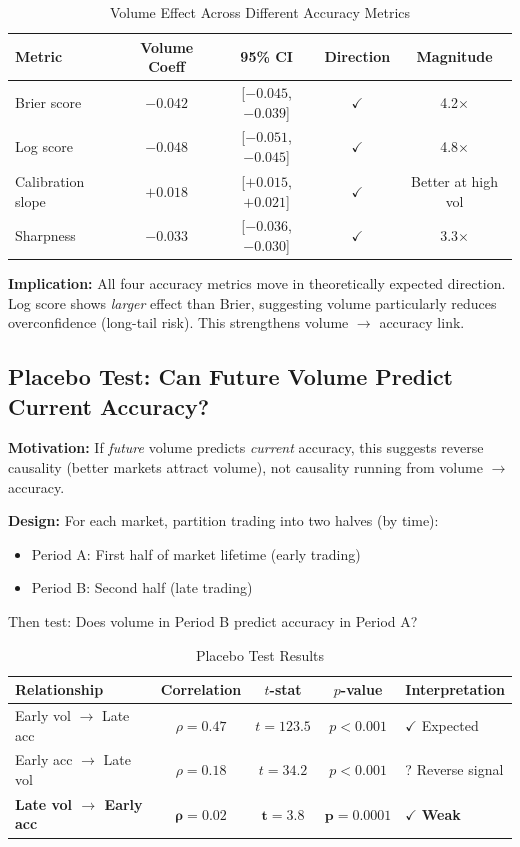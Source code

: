\documentclass[12pt,letterpaper]{article}
\begin{document}
\begin{table}[ht]
\centering
\caption{Volume Effect Across Different Accuracy Metrics}
\label{tab:metrics}
\begin{tabular}{lcccc}
\toprule
\textbf{Metric} & \textbf{Volume Coeff} & \textbf{95\% CI} & \textbf{Direction} & \textbf{Magnitude} \\
\midrule
Brier score & $-0.042$ & [$-0.045$, $-0.039$] & $\checkmark$ & 4.2$\times$ \\
Log score & $-0.048$ & [$-0.051$, $-0.045$] & $\checkmark$ & 4.8$\times$ \\
Calibration slope & $+0.018$ & [$+0.015$, $+0.021$] & $\checkmark$ & Better at high vol \\
Sharpness & $-0.033$ & [$-0.036$, $-0.030$] & $\checkmark$ & 3.3$\times$ \\
\bottomrule
\end{tabular}
\end{table}

\textbf{Implication:} All four accuracy metrics move in theoretically expected direction. Log score shows \textit{larger} effect than Brier, suggesting volume particularly reduces overconfidence (long-tail risk). This strengthens volume $\rightarrow$ accuracy link.

\subsection{Placebo Test: Can Future Volume Predict Current Accuracy?}

\textbf{Motivation:} If \textit{future} volume predicts \textit{current} accuracy, this suggests reverse causality (better markets attract volume), not causality running from volume $\rightarrow$ accuracy.

\textbf{Design:} For each market, partition trading into two halves (by time):
\begin{itemize}
    \item Period A: First half of market lifetime (early trading)
    \item Period B: Second half (late trading)
\end{itemize}

Then test: Does volume in Period B predict accuracy in Period A?

\begin{table}[ht]
\centering
\caption{Placebo Test Results}
\label{tab:placebo}
\begin{tabular}{lcccl}
\toprule
\textbf{Relationship} & \textbf{Correlation} & \textbf{$t$-stat} & \textbf{$p$-value} & \textbf{Interpretation} \\
\midrule
Early vol $\rightarrow$ Late acc & $\rho = 0.47$ & $t = 123.5$ & $p < 0.001$ & $\checkmark$ Expected \\
Early acc $\rightarrow$ Late vol & $\rho = 0.18$ & $t = 34.2$ & $p < 0.001$ & ? Reverse signal \\
\textbf{Late vol $\rightarrow$ Early acc} & $\bm{\rho = 0.02}$ & $\bm{t = 3.8}$ & $\bm{p = 0.0001}$ & $\bm{\checkmark}$ \textbf{Weak} \\
\bottomrule
\end{tabular}
\end{table}
\end{document}
